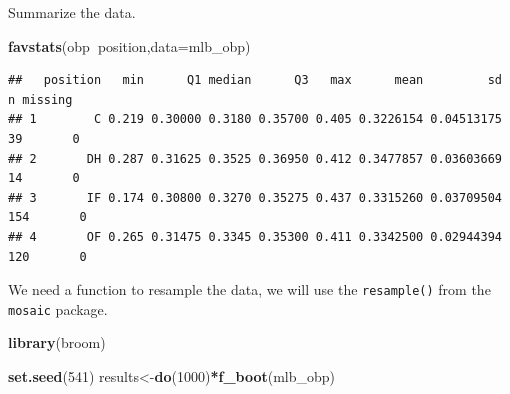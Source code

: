 \documentclass[
]{book}
\newenvironment{Shaded}{\begin{snugshade}}{\end{snugshade}}
\newcommand{\ControlFlowTok}[1]{\textcolor[rgb]{0.13,0.29,0.53}{\textbf{#1}}}
\newcommand{\DataTypeTok}[1]{\textcolor[rgb]{0.13,0.29,0.53}{#1}}
\newcommand{\DecValTok}[1]{\textcolor[rgb]{0.00,0.00,0.81}{#1}}
\newcommand{\KeywordTok}[1]{\textcolor[rgb]{0.13,0.29,0.53}{\textbf{#1}}}
\newcommand{\NormalTok}[1]{#1}
\newcommand{\OperatorTok}[1]{\textcolor[rgb]{0.81,0.36,0.00}{\textbf{#1}}}
\newcommand{\StringTok}[1]{\textcolor[rgb]{0.31,0.60,0.02}{#1}}
\begin{document}
Summarize the data.

\begin{Shaded}
\begin{Highlighting}[]
\KeywordTok{favstats}\NormalTok{(obp}\OperatorTok{~}\NormalTok{position,}\DataTypeTok{data=}\NormalTok{mlb_obp)}
\end{Highlighting}
\end{Shaded}

\begin{verbatim}
##   position   min      Q1 median      Q3   max      mean         sd   n missing
## 1        C 0.219 0.30000 0.3180 0.35700 0.405 0.3226154 0.04513175  39       0
## 2       DH 0.287 0.31625 0.3525 0.36950 0.412 0.3477857 0.03603669  14       0
## 3       IF 0.174 0.30800 0.3270 0.35275 0.437 0.3315260 0.03709504 154       0
## 4       OF 0.265 0.31475 0.3345 0.35300 0.411 0.3342500 0.02944394 120       0
\end{verbatim}

We need a function to resample the data, we will use the \texttt{resample()} from the \texttt{mosaic} package.

\begin{Shaded}
\begin{Highlighting}[]
\KeywordTok{library}\NormalTok{(broom)}
\end{Highlighting}
\end{Shaded}

\begin{Shaded}
\end{Shaded}

\begin{Shaded}
\begin{Highlighting}[]
\KeywordTok{set.seed}\NormalTok{(}\DecValTok{541}\NormalTok{)}
\NormalTok{results<-}\KeywordTok{do}\NormalTok{(}\DecValTok{1000}\NormalTok{)}\OperatorTok{*}\KeywordTok{f_boot}\NormalTok{(mlb_obp)}
\end{Highlighting}
\end{Shaded}
\end{document}
